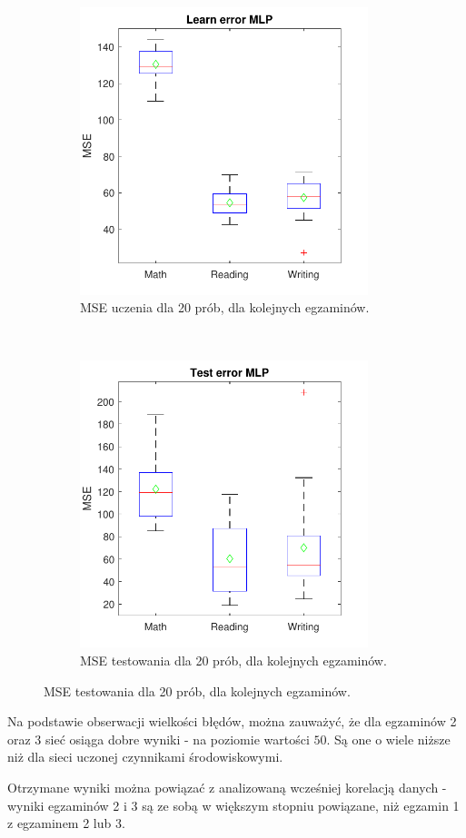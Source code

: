\documentclass[12pt]{article}
\begin{document}
\begin{figure}[H]
\centering
\begin{subfigure}[t]{0.48\textwidth} 
\centering
\includegraphics[height=3.3in]{cz3_egz_learn.pdf}
\caption{MSE uczenia dla 20 prób, dla kolejnych egzaminów.}
\end{subfigure}
~~
\begin{subfigure}[t]{0.48\textwidth} 
\centering
\includegraphics[height=3.3in]{cz3_egz_test.pdf}
\caption{MSE testowania dla 20 prób, dla kolejnych egzaminów.}
\end{subfigure}
\end{figure}

Na podstawie obserwacji wielkości błędów, można zauważyć, że dla egzaminów 2 oraz 3 sieć osiąga dobre wyniki - na poziomie wartości $50$.  Są one o wiele niższe niż dla sieci uczonej czynnikami środowiskowymi.

Otrzymane wyniki można powiązać z analizowaną wcześniej korelacją danych - wyniki egzaminów 2 i 3 są ze sobą w większym stopniu powiązane, niż egzamin 1 z egzaminem 2 lub 3.
\end{document}
